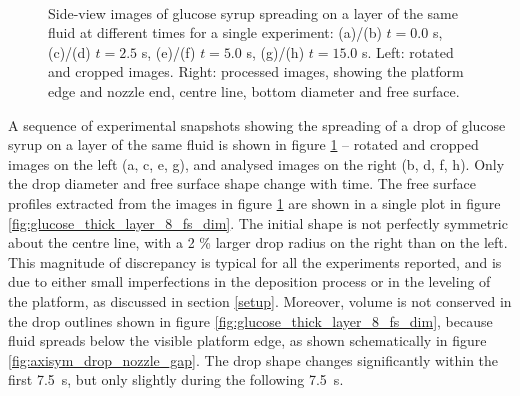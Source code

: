 \documentclass[aip,graphicx]{revtex4-1}
\begin{document}
\begin{figure}[!ht]
  \\
  \hspace{0.5cm}
  \caption{Side-view images of glucose syrup spreading on a layer of the same fluid at different times for a single experiment: (a)/(b) $t=0.0$ s, (c)/(d) $t=2.5$ s, (e)/(f) $t=5.0$ s, (g)/(h) $t=15.0$ s. Left: rotated and cropped images. Right: processed images, showing the platform edge and nozzle end, centre line, bottom diameter and free surface.\label{fig:glucose_spreading}}
\end{figure}

A sequence of experimental snapshots showing the spreading of a drop of glucose syrup on a layer of the same fluid is shown in figure \ref{fig:glucose_spreading} -- rotated and cropped  images on the left (a, c, e, g), and analysed images on the right (b, d, f, h). Only the drop diameter and free surface shape change with time. The free surface profiles extracted from the images in figure \ref{fig:glucose_spreading} are shown in a single plot in figure \ref{fig:glucose_thick_layer_8_fs_dim}. 
The initial shape is not perfectly symmetric about the centre line, with a 2 \% larger drop radius on the right than on the left. This magnitude of discrepancy is typical for all the experiments reported, and is due to either small imperfections in the deposition process or in the leveling of the platform, as discussed in section \ref{setup}. Moreover, volume is not conserved in the drop outlines shown in figure \ref{fig:glucose_thick_layer_8_fs_dim}, because fluid spreads below the visible platform edge, as shown schematically in figure \ref{fig:axisym_drop_nozzle_gap}. The drop shape changes significantly within the first 7.5~s, but only slightly during the following 7.5~s.
\end{document}
